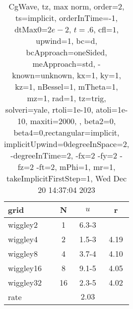 \begin{table}[H]\tableFont %
\begin{center}
\begin{tabular}{|l|c|c|c|} \hline 
grid  & N &  $ u $ & r \\ \hline 
  wiggley2 &     1 & \num{6.3}{-3} &        \\ \hline
  wiggley4 &     2 & \num{1.5}{-3} &  4.19  \\ \hline
  wiggley8 &     4 & \num{3.7}{-4} &  4.10  \\ \hline
 wiggley16 &     8 & \num{9.1}{-5} &  4.05  \\ \hline
 wiggley32 &    16 & \num{2.3}{-5} &  4.02  \\ \hline
    rate             &       &  $2.03$       &       \\ \hline
\end{tabular}
\caption{CgWave, tz, max norm, order=$2$, ts=implicit, orderInTime=-1, dtMax0=$2e-2$, $t=.6$, cfl=$1$, upwind=1, bc=d, bcApproach=oneSided, meApproach=std, -known=unknown, kx=1, ky=1, kz=1, nBessel=1, mTheta=1, mz=1, rad=1, tz=trig, solveri=yale, rtoli=1e-10, atoli=1e-10, maxiti=2000, , beta2=0, beta4=0,rectangular=implicit, implicitUpwind=0degreeInSpace=2, -degreeInTime=2, -fx=2 -fy=2 -fz=2 -ft=2, mPhi=1, mr=1, takeImplicitFirstStep=1, Wed Dec 20 14:37:04 2023}\label{table:tzOrder2max}
\end{center}
\end{table}
